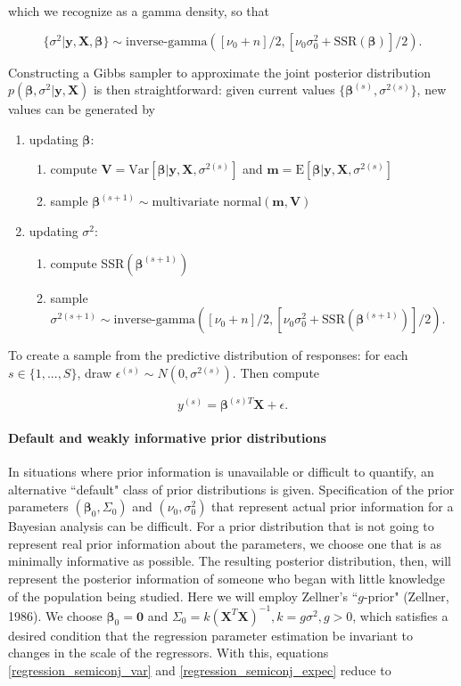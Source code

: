 \documentclass[12pt, a4paper]{article}
\begin{document}
\noindent which we recognize as a gamma density, so that

$$\{\sigma^2|\mathbf{y,X},\boldsymbol\beta\} \sim \text{inverse-gamma}([\nu_0 + n]/2,[\nu_0\sigma^2_0 + \text{SSR}(\boldsymbol\beta)]/2).$$

\noindent Constructing a Gibbs sampler to approximate the joint posterior distribution $p(\boldsymbol\beta,\sigma^2|\mathbf{y,X})$ is then straightforward:  given current values $\{\boldsymbol\beta^{(s)},\sigma^{2(s)}\}$, new values can be generated by

\begin{enumerate}
    \item updating $\boldsymbol\beta$:
    \begin{enumerate}
        \item compute $\mathbf{V} = \text{Var}[\boldsymbol\beta|\mathbf{y,X},\sigma^{2(s)}]$ and $\mathbf{m} = \text{E}[\boldsymbol\beta|\mathbf{y,X},\sigma^{2(s)}]$
        \item sample $\boldsymbol\beta^{(s+1)} \sim \text{multivariate normal}(\mathbf{m,V})$
    \end{enumerate}
    \item updating $\sigma^2$:
    \begin{enumerate}
        \item compute SSR$(\boldsymbol\beta^{(s+1)})$
        \item sample $\sigma^{2(s+1)} \sim \text{inverse-gamma}([\nu_0 + n]/2,[\nu_0\sigma_0^2 + \text{SSR}(\boldsymbol\beta^{(s+1)})]/2)$.
    \end{enumerate}
\end{enumerate}

To create a sample from the predictive distribution of responses:  for each $s\in\{1,...,S\}$, draw $\epsilon^{(s)} \sim N(0,\sigma^{2(s)})$.  Then compute

$$y^{(s)} = \boldsymbol\beta^{(s)T}\mathbf{X} + \epsilon.$$

    \paragraph{Default and weakly informative prior distributions}
    In situations where prior information is unavailable or difficult to quantify, an alternative ``default" class of prior distributions is given. Specification of the prior parameters $(\boldsymbol\beta_0, \Sigma_0)$ and $(\nu_0,\sigma^2_0)$ that represent actual prior information for a Bayesian analysis can be difficult.  For a prior distribution that is not going to represent real prior information about the parameters, we choose one that is as minimally informative as possible.  The resulting posterior distribution, then, will represent the posterior information of someone who began with little knowledge of the population being studied.  Here we will employ Zellner's ``$g$-prior" (Zellner, 1986).  We choose $\boldsymbol\beta_0 = \mathbf{0}$ and $\Sigma_0 = k(\mathbf{X}^T\mathbf{X})^{-1}, k = g\sigma^2, g > 0$, which satisfies a desired condition that the regression parameter estimation be invariant to changes in the scale of the regressors.  With this, equations \ref{regression_semiconj_var} and \ref{regression_semiconj_expec} reduce to
\end{document}
